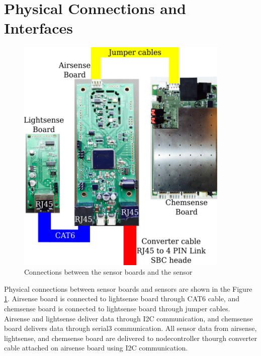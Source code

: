 \section{Physical Connections and Interfaces}

\begin{figure}[h]
\begin{center}
\includegraphics[width=4in]{g4353.png}
\caption{Connections between the sensor boards and the sensor}
\label{fig:physicalConnections}
\end{center}
\end{figure}

Physical connections between sensor boards and sensors are shown in the Figure \ref{fig:physicalConnections}. Airsense board is connected to lightsense board through CAT6 cable, and chemsense board is connected to lightsense board through jumper cables. Airsense and lightsense deliver data through I2C communication, and chemsense board delivers data through serial3 communication. All sensor data from airsense, lightsense, and chemsense board are delivered to nodecontroller thourgh converter cable attached on airsense board using I2C communication.